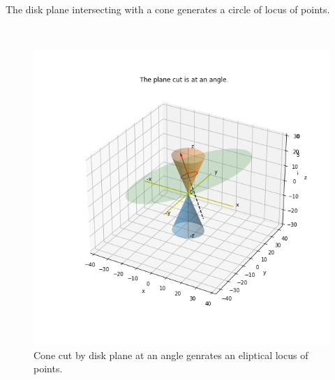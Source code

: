 \documentclass[10pt,a4paper,leqno]{article}
\begin{document}
\begin{CJK*}{UTF8}{gbsn}
\noindent The disk plane intersecting with a cone generates a circle of locus of points.
 \par \ \par\begin{figure}[H]
\centering\includegraphics[width=1\linewidth,height=0.3\textheight]{Data/fgr04.png}
\caption{Cone cut by disk plane at an angle genrates an eliptical locus of points.}
\label{fig:Data/fgr04.png}
\end{figure}

\noindent  
 
 \par \ \par\noindent \end{CJK*}
 \par \ \par
\end{document}
